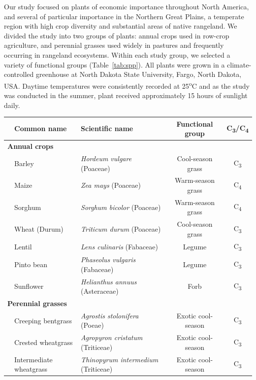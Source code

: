 \documentclass{svjour3}
\begin{document}
Our study focused on plants of economic importance throughout North America, and several of particular  importance in the Northern Great Plains, a temperate region with high crop diversity and substantial areas of native rangeland. 
We divided the study into two groups of plants: annual crops used in row-crop agriculture, and perennial grasses used widely in pastures and frequently occurring in rangeland ecosystems. 
Within each study group, we selected a variety of functional groups (Table~\ref{tab:spp}). 
All plants were grown in a climate-controlled greenhouse at North Dakota State University, Fargo, North Dakota, USA. 
Daytime temperatures were consistently recorded at 25\textsuperscript{o}C and as the study was conducted in the summer, plant received approximately 15 hours of sunlight daily.

\begin{table}[]
\centering
\begin{tabular}{@{}lllcc@{}}
\toprule
  & Common name & Scientific name   &  Functional group &  C\textsubscript{3}/C\textsubscript{4} \\ \midrule
 \multicolumn{5}{l}{\bfseries Annual crops} \\
  & Barley  &  \emph{Hordeum vulgare} (Poaceae)  & Cool-season grass & C\textsubscript{3}  \\
  & Maize  &  \emph{Zea mays} (Poaceae)  & Warm-season grass & C\textsubscript{4}  \\
   & Sorghum  &  \emph{Sorghum bicolor} (Poaceae)  & Warm-season grass & C\textsubscript{4}  \\
  & Wheat (Durum) &  \emph{Triticum durum} (Poaceae)  & Cool-season grass & C\textsubscript{3}  \\
   & Lentil  &  \emph{Lens culinaris} (Fabaceae)  & Legume & C\textsubscript{3}  \\
  & Pinto bean  &  \emph{Phaseolus vulgaris} (Fabaceae)  & Legume & C\textsubscript{3}  \\
   & Sunflower  &  \emph{Helianthus annuus} (Asteraceae)  & Forb & C\textsubscript{3}  \\\midrule
 \multicolumn{5}{l}{\bfseries Perennial grasses} \\ 
  & Creeping bentgrass &  \emph{Agrostis stolonifera} (Poeae)  & Exotic cool-season & C\textsubscript{3}  \\
    & Crested wheatgrass &  \emph{Agropyron cristatum} (Triticeae)  & Exotic cool-season  & C\textsubscript{3}  \\
   & Intermediate wheatgrass &  \emph{Thinopyrum intermedium} (Triticeae)  & Exotic cool-season & C\textsubscript{3}  \\

\end{tabular}
\end{table}
\end{document}

